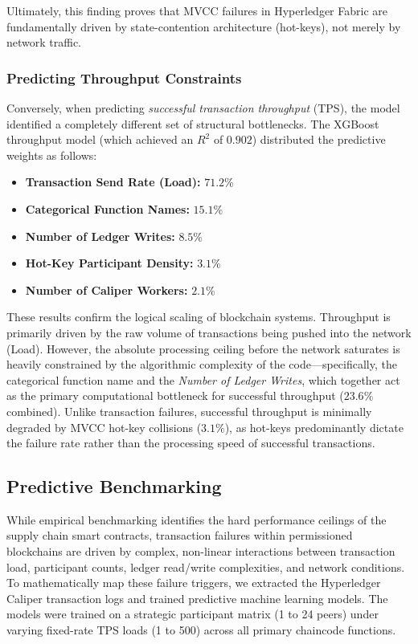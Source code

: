 \documentclass[12pt]{article}
\begin{document}
	Ultimately, this finding proves that MVCC failures in Hyperledger Fabric are fundamentally driven by state-contention architecture (hot-keys), not merely by network traffic.

	\subsubsection{Predicting Throughput Constraints}
	Conversely, when predicting \textit{successful transaction throughput} (TPS), the model identified a completely different set of structural bottlenecks. The XGBoost throughput model (which achieved an $R^2$ of $0.902$) distributed the predictive weights as follows:
	\begin{itemize}
	    \item \textbf{Transaction Send Rate (Load):} $71.2\%$
	    \item \textbf{Categorical Function Names:} $15.1\%$
	    \item \textbf{Number of Ledger Writes:} $8.5\%$
	    \item \textbf{Hot-Key Participant Density:} $3.1\%$
	    \item \textbf{Number of Caliper Workers:} $2.1\%$
	\end{itemize}
	
	These results confirm the logical scaling of blockchain systems. Throughput is primarily driven by the raw volume of transactions being pushed into the network (Load). However, the absolute processing ceiling before the network saturates is heavily constrained by the algorithmic complexity of the code---specifically, the categorical function name and the \textit{Number of Ledger Writes}, which together act as the primary computational bottleneck for successful throughput ($23.6\%$ combined). Unlike transaction failures, successful throughput is minimally degraded by MVCC hot-key collisions ($3.1\%$), as hot-keys predominantly dictate the failure rate rather than the processing speed of successful transactions.

	
\subsection{Predictive Benchmarking}

While empirical benchmarking identifies the hard performance ceilings of the supply chain smart contracts, transaction failures within permissioned blockchains are driven by complex, non-linear interactions between transaction load, participant counts, ledger read/write complexities, and network conditions. To mathematically map these failure triggers, we extracted the Hyperledger Caliper transaction logs and trained predictive machine learning models. The models were trained on a strategic participant matrix (1 to 24 peers) under varying fixed-rate TPS loads (1 to 500) across all primary chaincode functions.
\end{document}
